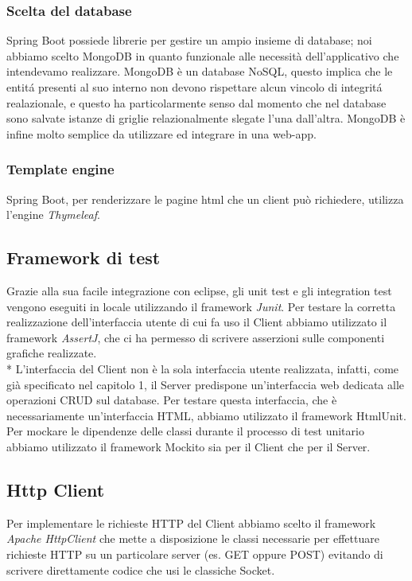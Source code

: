 \subsubsection{Scelta del database}
Spring Boot possiede librerie per gestire un ampio insieme di database; noi abbiamo scelto MongoDB in quanto funzionale alle necessit\`a dell'applicativo che intendevamo realizzare. MongoDB \`e un database NoSQL, questo implica che le entit\'a presenti al suo interno non devono rispettare alcun vincolo di integrit\'a realazionale, e questo ha particolarmente senso dal momento che nel database sono salvate istanze di griglie relazionalmente slegate l'una dall'altra. MongoDB \`e infine molto semplice da utilizzare ed integrare in una web-app.
\subsubsection{Template engine}
Spring Boot, per renderizzare le pagine html che un client pu\`o richiedere, utilizza l'engine \emph{Thymeleaf}.
\subsection{Framework di test}
Grazie alla sua facile integrazione con eclipse, gli unit test e gli integration test vengono eseguiti in locale utilizzando il framework \emph{Junit}. Per testare la corretta realizzazione dell'interfaccia utente di cui fa uso il Client abbiamo utilizzato il framework \emph{AssertJ}, che ci ha permesso di scrivere asserzioni sulle componenti grafiche realizzate.\\*
L'interfaccia del Client non \`e la sola interfaccia utente realizzata, infatti, come gi\`a specificato nel capitolo 1, il Server predispone un'interfaccia web dedicata alle operazioni CRUD sul database. Per testare questa interfaccia, che \`e necessariamente un'interfaccia HTML, abbiamo utilizzato il framework HtmlUnit. Per mockare le dipendenze delle classi durante il processo di test unitario abbiamo utilizzato il framework Mockito sia per il Client che per il Server.
\subsection{Http Client}
Per implementare le richieste HTTP del Client abbiamo scelto il framework \emph{Apache HttpClient} che mette a disposizione le classi necessarie per effettuare richieste HTTP su un particolare server (es. GET oppure POST) evitando di scrivere direttamente codice che usi le classiche Socket.
